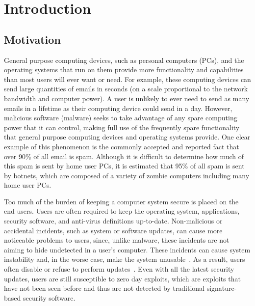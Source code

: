
\chapter{Introduction}

\section{Motivation}

General purpose computing devices, such as personal computers (PCs), and the operating systems that run on them provide more functionality and capabilities than most users will ever want or need. For example, these computing devices can send large quantities of emails in seconds (on a scale proportional to the network bandwidth and computer power). A user is unlikely to ever need to send as many emails in a lifetime as their computing device could send in a day.  However, malicious software (malware) seeks to take advantage of any spare computing power that it can control, making full use of the frequently spare functionality that general purpose computing devices and operating systems provide. One clear example of this phenomenon is the commonly accepted and reported fact that over 90\% of all email is spam\cite{spamcraft_2009}. Although it is difficult to determine how much of this spam is sent by home user PCs, it is estimated that 95\% of all spam is sent by botnets\cite{symantec_messagelabs_intelligence_report}, which are composed of a variety of zombie computers including many home user PCs.

Too much of the burden of keeping a computer system secure is placed on the end users. Users are often required to keep the operating system, applications, security software, and anti-virus definitions up-to-date. Non-malicious or accidental incidents, such as system or software updates, can cause more noticeable problems to users, since, unlike malware, these incidents are not aiming to hide undetected in a user's computer. These incidents can cause system instability and, in the worse case, make the system unusable~\cite{MSRC_XP_blue_screen_2010, Krebs_2010, Tech_World_2005, Japan_Times_2005}. As a result, users often disable or refuse to perform updates~\cite{The_Register_2009, Microsoft_TechNet_2010, MS_SIR_2009}. Even with all the latest security updates, users are still susceptible to zero day exploits, which are exploits that have not been seen before and thus are not detected by traditional signature-based security software.

